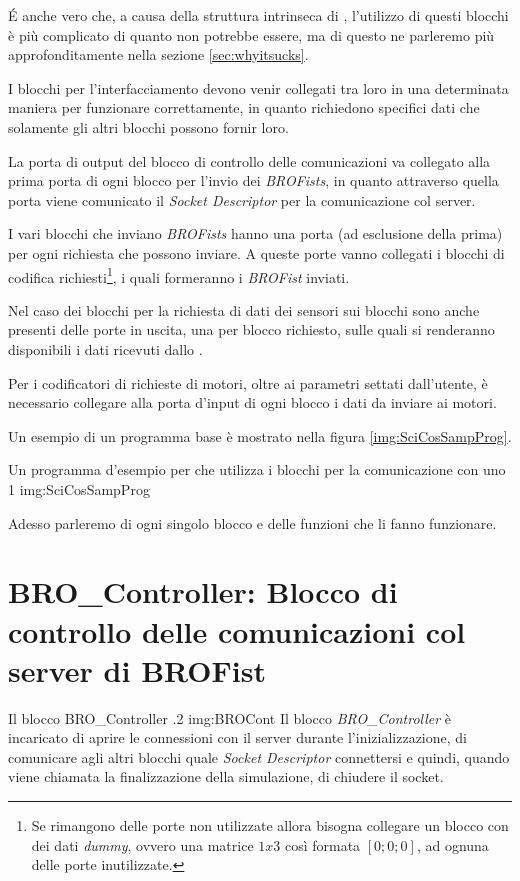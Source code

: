 \'E anche vero che, a causa della struttura intrinseca di \SciCos{},
l'utilizzo di questi blocchi è più complicato di quanto non potrebbe
essere, ma di questo ne parleremo più approfonditamente nella sezione
\ref{sec:whyitsucks}.

I blocchi per l'interfacciamento devono venir collegati tra loro in una
determinata maniera per funzionare correttamente, in quanto richiedono
specifici dati che solamente gli altri blocchi possono fornir loro.

La porta di output del blocco di controllo delle comunicazioni va collegato
alla prima porta di ogni blocco per l'invio dei \emph{BROFists}, in quanto
attraverso quella porta viene comunicato il \emph{Socket Descriptor} per la
comunicazione col server.

I vari blocchi che inviano \emph{BROFists} hanno una porta (ad esclusione
della prima) per ogni richiesta che possono inviare. A queste porte vanno
collegati i blocchi di codifica richiesti\footnote{Se rimangono delle porte
non utilizzate allora bisogna collegare un blocco con dei dati
\emph{dummy}, ovvero una matrice $1x3$ così formata $[0;0;0]$, ad ognuna
delle porte inutilizzate.}, i quali formeranno i \emph{BROFist} inviati.

Nel caso dei blocchi per la richiesta di dati dei sensori sui blocchi sono
anche presenti delle porte in uscita, una per blocco richiesto, sulle quali
si renderanno disponibili i dati ricevuti dallo \SPAM{}.

Per i codificatori di richieste di motori, oltre ai parametri settati
dall'utente, è necessario collegare alla porta d'input di ogni blocco i
dati da inviare ai motori.

Un esempio di un programma base è mostrato nella figura
\ref{img:SciCosSampProg}.

        {Un programma d'esempio per \SciCos{} che utilizza i blocchi per la
        comunicazione con uno \SPAM{}}
        {1}
        {img:SciCosSampProg}

Adesso parleremo di ogni singolo blocco e delle funzioni che li fanno
funzionare.

\section[BRO\_Controller]{BRO\_Controller: Blocco di controllo delle
comunicazioni col server di BROFist}
        {Il blocco BRO\_Controller}
        {.2}
        {img:BROCont}
Il blocco \emph{BRO\_Controller} è incaricato di aprire le connessioni con
il server durante l'inizializzazione, di comunicare agli altri blocchi
quale \emph{Socket Descriptor} connettersi e quindi, quando viene chiamata
la finalizzazione della simulazione, di chiudere il socket.

